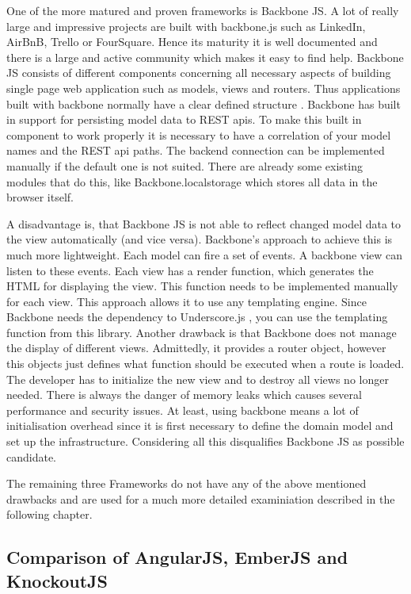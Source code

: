 One of the more matured and proven frameworks is Backbone JS.
A lot of really large and impressive projects are built with backbone.js such as LinkedIn, AirBnB, Trello or FourSquare.
Hence its maturity it is well documented and there is a large and active community which makes it easy to find help.
Backbone JS  consists of different components concerning all necessary aspects of building single page web application such as models, views and routers.
Thus applications built with backbone normally have a clear defined structure \autocite{tech-ana:heise-backbone}.
Backbone has built in support for persisting model data to REST apis.
To make this built in component to work properly it is necessary to have a correlation of your model names and the REST api paths.
The backend connection can be implemented manually if the default one is not suited.
There are already some existing modules that do this, like Backbone.localstorage which stores all data in the browser itself.

A disadvantage is, that Backbone JS is not able to reflect changed model data to the view automatically (and vice versa).
Backbone's approach to achieve this is much more lightweight.
Each model can fire a set of events.
A backbone view can listen to these events.
Each view has a render function, which generates the HTML for displaying the view.
This function needs to be implemented manually for each view.
This approach allows it to use any templating engine.
Since Backbone needs the dependency to Underscore.js , you can use the templating function from this library.
Another drawback is that Backbone does not manage the display of different views.
Admittedly, it provides a router object, however this objects just defines what function should be executed when a route is loaded.
The developer has to initialize the new view and to destroy all views no longer needed.
There is always the danger of memory leaks which causes several performance and security issues.
At least, using backbone means a lot of initialisation overhead since it is first necessary to define the domain model and set up the infrastructure.
Considering all this disqualifies Backbone JS as possible candidate.
      
The remaining three Frameworks do not have any of the above mentioned drawbacks and are used for a much more detailed examiniation described in the following chapter.

\subsection{Comparison of AngularJS, EmberJS and KnockoutJS}\label{chap:detail_comparison}

